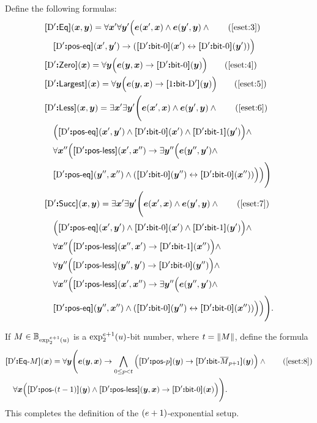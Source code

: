 Define the following formulas:
\begin{align}
  &\fEq\DSp(\xx,\yy) = \forall\xxp\forall\yyp\Big(\se(\xxp,\xx) \land
  \se(\yyp,\yy) \land \tag{\ref{eset:3}} \\
  &\quad\fposeq\DSp(\xxp,\yyp) \limp (\fbitO\DSp(\xxp) \lequ
  \fbitO\DSp(\yyp))\Big)
  \nonumber \\
  &\fZero\DSp(\xx) = \forall\yy\Big(\se(\yy,\xx) \limp \fbitO\DSp(\yy)\Big)
  \tag{\ref{eset:4}} \\
  &\fMax\DSp(\xx) = \forall\yy\Big(\se(\yy,\xx) \limp \fbit1\DSp(\yy)\Big)
  \tag{\ref{eset:5}} \\
  &\fLess\DSp(\xx,\yy) = \exists\xxp\exists\yyp\Bigg(\se(\xxp,\xx) \land
  \se(\yyp,\yy) \land \tag{\ref{eset:6}} \\
  &\quad\Big(\fposeq\DSp(\xxp,\yyp) \land \fbitO\DSp(\xxp) \land
  \fbitI\DSp(\yyp)\Big) \land \nonumber \\
  &\quad\forall\xxpp\Big(\fposless\DSp(\xxp,\xxpp) \limp \exists\yypp\Big(
  \se(\yypp,\yyp) \land \nonumber \\
  &\quad\fposeq\DSp(\yypp,\xxpp) \land (\fbitO\DSp(\yypp) \lequ
  \fbitO\DSp(\xxpp)) \Big)\Big)\Bigg) \nonumber \\
  &\fSucc\DSp(\xx,\yy) = \exists\xxp\exists\yyp\Bigg(\se(\xxp,\xx) \land
  \se(\yyp,\yy) \land \tag{\ref{eset:7}} \\
  &\quad\Big(\fposeq\DSp(\xxp,\yyp) \land \fbitO\DSp(\xxp) \land
  \fbitI\DSp(\yyp)\Big) \land \nonumber \\
  &\quad\forall\xxpp\Big(\fposless\DSp(\xxpp,\xxp) \limp \fbitI\DSp(\xxpp)\Big)
  \land \nonumber \\
  &\quad\forall\yypp\Big(\fposless\DSp(\yypp,\yyp) \limp \fbitO\DSp(\yypp)\Big)
  \land \nonumber \\
  &\quad\forall\xxpp\Big(\fposless\DSp(\xxp,\xxpp) \limp \exists\yypp\Big(
  \se(\yypp,\yyp) \land \nonumber \\
  &\quad\fposeq\DSp(\yypp,\xxpp) \land (\fbitO\DSp(\yypp) \lequ
  \fbitO\DSp(\xxpp))\Big)\Big)\Bigg). \nonumber
\end{align}

If $\nM \in \tBitnums{\tetr{\sze+1}2\szu}$ is a $\tetr{\sze+1}2\szu$-bit number,
where $\tbit = \bsz\nM$, define the formula
\begin{align}
&\fDataA\DSp\nM(\xx) = \forall\yy\Bigg(\se(\yy,\xx) \limp
\bigwedge_{0 \leq \posp < \tbit} \Big(\fposA\DSp\posp(\yy) \limp
\fbit\DSp{\benc{\nM}_{\posp+1}}(\yy)\Big) \land \tag{\ref{eset:8}} \\
&\quad\forall\xx\Big(\fposA\DSp{(\tbit-1)}(\yy) \land 
\fposless\DSp(\yy,\xx) \limp \fbitO\DSp(\xx)\Big)\Bigg). \nonumber
\end{align}
This completes the definition of the $(\sze+1)$-exponential setup.

